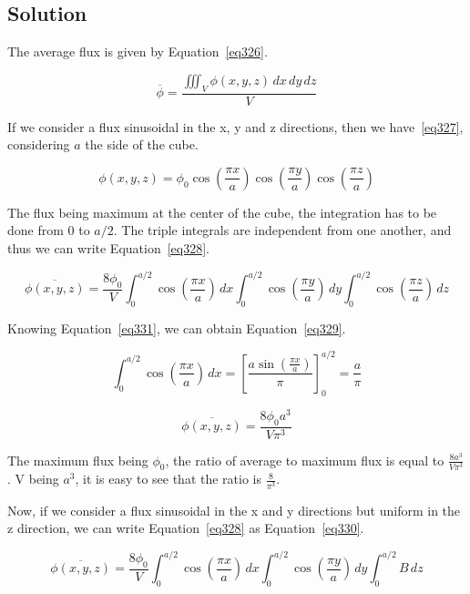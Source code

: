 \subsection{Solution}

The average flux is given by Equation~\ref{eq326}.

\begin{equation}\label{eq326}
\overline{\phi} = \frac{\iiint_V \phi(x,y,z) \,dx\,dy\,dz}{V}
\end{equation}

If we consider a flux sinusoidal in the x, y and z directions, then we have~\ref{eq327}, considering $a$ the side of the cube.

\begin{equation}\label{eq327}
\phi(x,y,z) = \phi_0\cos(\frac{\pi x}{a})\cos(\frac{\pi y}{a})\cos(\frac{\pi z}{a})
\end{equation}

The flux being maximum at the center of the cube, the integration has to be done from 0 to $a/2$. The triple integrals are independent from one another, and thus we can write Equation~\ref{eq328}.

\begin{equation}\label{eq328}
\overline{\phi(x,y,z)} = \frac{8 \phi_0}{V} \int_0^{a/2} \cos(\frac{\pi x}{a}) \,dx \int_0^{a/2} \cos(\frac{\pi y}{a}) \,dy \int_0^{a/2} \cos(\frac{\pi z}{a}) \,dz 
\end{equation}


Knowing Equation~\ref{eq331}, we can obtain Equation~\ref{eq329}.

\begin{equation}\label{eq331}
\int_0^{a/2} \cos(\frac{\pi x}{a}) \,dx = \left[ \frac{a \sin(\frac{\pi x}{a})}{\pi} \right]_0^{a/2} = \frac{a}{\pi}
\end{equation}

\begin{equation}\label{eq329}
\overline{\phi(x,y,z)} = \frac{8 \phi_0 a^3}{V\pi^3} 
\end{equation}

The maximum flux being $\phi_0$, the ratio of average to maximum flux is equal to $\frac{8 a^3}{V\pi^3}$. V being $a^3$, it is easy to see that the ratio is $\frac{8}{\pi^3}$.

Now, if we consider a flux sinusoidal in the x and y directions but uniform in the z direction, we can write Equation~\ref{eq328} as Equation~\ref{eq330}.


\begin{equation}\label{eq330}
\overline{\phi(x,y,z)} = \frac{8 \phi_0}{V} \int_0^{a/2} \cos(\frac{\pi x}{a}) \,dx \int_0^{a/2} \cos(\frac{\pi y}{a}) \,dy \int_0^{a/2} B \,dz 
\end{equation}

